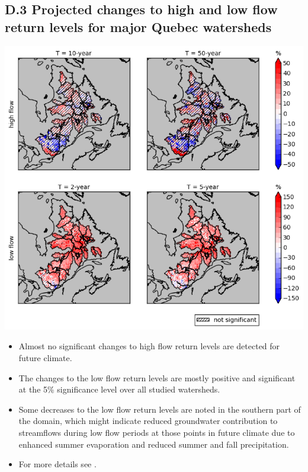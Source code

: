 \documentclass[a0,landscape]{a0poster}
\begin{document}
\begin{multicols*}{4}
\subsection*{D.3 Projected changes to high and low flow return levels for major Quebec watersheds}
\begin{minipage}[t]{\linewidth}
  \begin{minipage}[t]{0.5\linewidth}
      \includegraphics[width=0.95\linewidth]{extreme_low_and_high_flow_RL}
  \end{minipage}
  \hfill
  \begin{minipage}[c]{0.45\linewidth}
    \center
    \begin{itemize}
      \item Almost no significant changes to high flow return levels are detected for future climate.
      \item The changes to the low flow return levels are mostly positive and significant at the 5\% significance level over all studied watersheds.
      \item Some decreases to the low flow return levels are noted in the southern part of the domain, which might indicate reduced groundwater contribution to streamflows during low flow periods at those points in future climate due to enhanced summer evaporation and reduced summer and fall precipitation.
      \item For more details see \citet{huziy2016impact}.
    \end{itemize}
  \end{minipage}
\end{minipage}




\end{multicols*}
\end{document}
